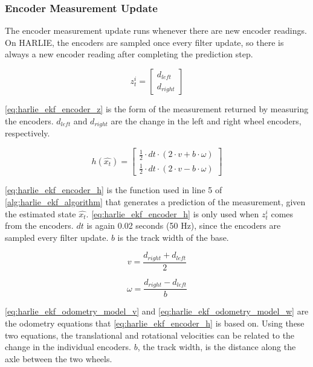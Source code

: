\subsubsection{Encoder Measurement Update}\label{subsubsec:harlie_ekf_encoder_measurement}

The encoder measurement update runs whenever there are new encoder readings. On HARLIE, the encoders are sampled once every filter update, so there is always a new encoder reading after completing the prediction step.

\begin{equation}
	z_t^i = 
	\begin{bmatrix}
		d_{left} \\
		d_{right}
	\end{bmatrix}
	\label{eq:harlie_ekf_encoder_z}
\end{equation}

\eqref{eq:harlie_ekf_encoder_z} is the form of the measurement returned by measuring the encoders. $d_{left}$ and $d_{right}$ are the change in the left and right wheel encoders, respectively.

\begin{equation}
	h\left(\hat{x_t}\right) =
	\begin{bmatrix}
		\frac{1}{2} \cdot dt \cdot \left( 2 \cdot v + b \cdot \omega \right) \\
		\frac{1}{2} \cdot dt \cdot \left( 2 \cdot v - b \cdot \omega \right) 
	\end{bmatrix}
	\label{eq:harlie_ekf_encoder_h}
\end{equation}

\eqref{eq:harlie_ekf_encoder_h} is the function used in line 5 of \autoref{alg:harlie_ekf_algorithm} that generates a prediction of the measurement, given the estimated state $\hat{x_t}$. \eqref{eq:harlie_ekf_encoder_h} is only used when $z_t^i$ comes from the encoders. $dt$ is again 0.02 seconds (50 Hz), since the encoders are sampled every filter update. $b$ is the track width of the base. 

\begin{equation}
	v = \frac{d_{right}+d_{left}}{2}
	\label{eq:harlie_ekf_odometry_model_v}
\end{equation}

\begin{equation}
	\omega = \frac{d_{right} - d_{left}}{b}
	\label{eq:harlie_ekf_odometry_model_w}
\end{equation}

\eqref{eq:harlie_ekf_odometry_model_v} and \eqref{eq:harlie_ekf_odometry_model_w} are the odometry equations that \eqref{eq:harlie_ekf_encoder_h} is based on. Using these two equations, the translational and rotational velocities can be related to the change in the individual encoders. $b$, the track width, is the distance along the axle between the two wheels.

